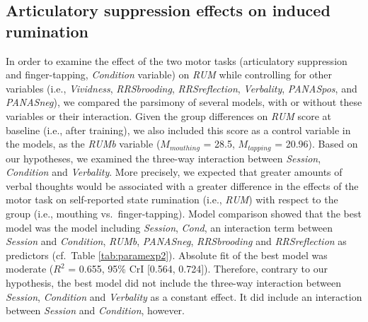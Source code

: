 \documentclass[a4paper,12pt,twoside,onecolumn,openright,final,oldfontcommands]{memoir}
\begin{document}
\hypertarget{articulatory-suppression-effects-on-induced-rumination}{%
\subsection{Articulatory suppression effects on induced rumination}\label{articulatory-suppression-effects-on-induced-rumination}}

In order to examine the effect of the two motor tasks (articulatory suppression and finger-tapping, \emph{Condition} variable) on \emph{RUM} while controlling for other variables (i.e., \emph{Vividness}, \emph{RRSbrooding}, \emph{RRSreflection}, \emph{Verbality}, \emph{PANASpos}, and \emph{PANASneg}), we compared the parsimony of several models, with or without these variables or their interaction. Given the group differences on \emph{RUM} score at baseline (i.e., after training), we also included this score as a control variable in the models, as the \emph{RUMb} variable (\(M_{mouthing}\) = 28.5, \(M_{tapping}\) = 20.96). Based on our hypotheses, we examined the three-way interaction between \emph{Session}, \emph{Condition} and \emph{Verbality}. More precisely, we expected that greater amounts of verbal thoughts would be associated with a greater difference in the effects of the motor task on self-reported state rumination (i.e., \emph{RUM}) with respect to the group (i.e., mouthing vs.~finger-tapping). Model comparison showed that the best model was the model including \emph{Session}, \emph{Cond}, an interaction term between \emph{Session} and \emph{Condition}, \emph{RUMb}, \emph{PANASneg}, \emph{RRSbrooding} and \emph{RRSreflection} as predictors (cf.~Table \ref{tab:paramexp2}). Absolute fit of the best model was moderate (\(R^2\) = 0.655, 95\% CrI {[}0.564, 0.724{]}). Therefore, contrary to our hypothesis, the best model did not include the three-way interaction between \emph{Session}, \emph{Condition} and \emph{Verbality} as a constant effect. It did include an interaction between \emph{Session} and \emph{Condition}, however.
\end{document}
